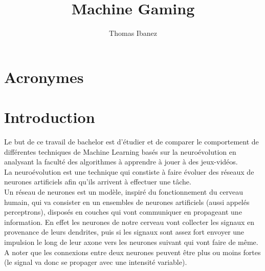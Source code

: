 \documentclass{article}
\title{Machine Gaming}
\author{Thomas Ibanez}
\begin{document}
\tableofcontents

\newpage

\listoffigures

\newpage

\section*{Acronymes}

\section{Introduction}

Le but de ce travail de bachelor est d'étudier et de comparer le comportement de différentes techniques de Machine Learning basés sur la neuroévolution en analysant la faculté des algorithmes à apprendre à jouer à des jeux-vidéos.\\

La neuroévolution est une technique qui constiste à faire évoluer des réseaux de neurones artificiels afin qu'ils arrivent à effectuer une tâche.\\

Un réseau de neurones est un modèle, inspiré du fonctionnement du cerveau humain, qui va consister en un ensembles de neurones artificiels (aussi appelés perceptrons), disposés en couches qui vont communiquer en propageant une information. En effet les neurones de notre cerveau vont collecter les signaux en provenance de leurs dendrites, puis si les signaux sont assez fort envoyer une impulsion le long de leur axone vers les neurones suivant qui vont faire de même. A noter que les connexions entre deux neurones peuvent être plus ou moins fortes (le signal va donc se propager avec une intensité variable).
\end{document}

